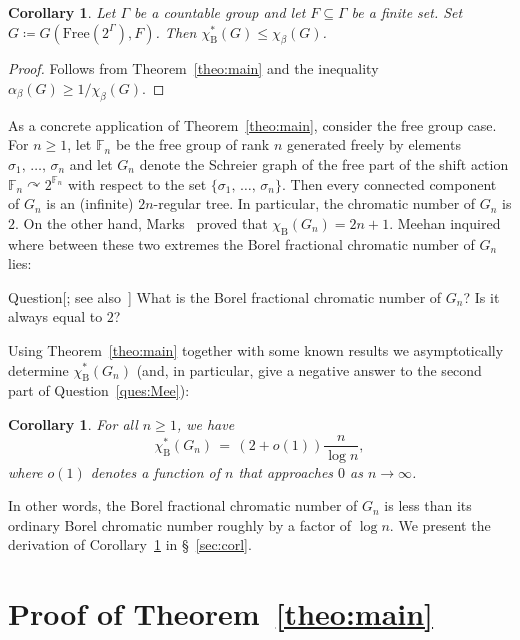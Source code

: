 \documentclass[10pt]{amsart}
\newtheorem{coro}[cdrthm]{Corollary}
\theoremstyle{definition}
\newcommand{\0}{\varnothing}
\newcommand{\set}[1]{\{#1\}}
\renewcommand{\leq}{\leqslant}
\renewcommand{\geq}{\geqslant}
\newcommand{\defeq}{\coloneqq}
\newcommand{\F}{\mathbb{F}}
\newcommand{\Free}{\mathrm{Free}}
\newcommand{\rmB}{\mathrm{B}}
\begin{document}
\begin{coro}
Let $\Gamma$ be a countable group and let $F \subseteq \Gamma$ be a finite set. Set $G
\defeq G(\Free(2^{\Gamma}), F)$. Then $\chi^\ast_\rmB(G) \leq \chi_\beta(G)$.
\end{coro}


\begin{proof}
Follows from Theorem~\ref{theo:main} and the inequality $\alpha_\beta(G) \geq 1/\chi_\beta(G)$.
\end{proof}

As a concrete application of Theorem~\ref{theo:main}, consider the free group case. For $n \geq 1$, let $\F_n$ be the free group of rank $n$ generated freely by elements $\sigma_1,\, \ldots,\,\sigma_n$ and let $G_n$ denote the Schreier graph of the free part of the shift action $\F_n \curvearrowright 2^{\F_n}$ with respect to the set $\set{\sigma_1,\,\ldots,\, \sigma_n}$. Then every connected component of $G_n$ is an (infinite) $2n$-regular tree. In particular, the chromatic number of $G_n$ is $2$. On the other hand, Marks~\cite{Marks} proved that $\chi_{\rmB}(G_n) = 2n+1$. Meehan inquired where between these two extremes the Borel fractional chromatic number of $G_n$ lies:

\begin{enonce}[plain]{Question}[{\cite[Question~4.6.3]{Mee}; see also~\cite[Problem~8.17]{KechrisMarks}}]\label{ques:Mee}
What is the Borel fractional chromatic number of $G_n$? Is it always equal to $2$?
\end{enonce}

Using Theorem~\ref{theo:main} together with some known results we asymptotically determine $\chi_\rmB^\ast(G_n)$ (and, in particular, give a negative answer to the second part of Question~\ref{ques:Mee}):

\begin{coro}\label{corl:free}
For all $n \geq 1$, we have
\[
\chi_\rmB^\ast(G_n) \,=\, (2+o(1))\frac{n}{\log n},
\]
where $o(1)$ denotes a function of $n$ that approaches $0$ as $n \to \infty$.
\end{coro}

In other words, the Borel fractional chromatic number of $G_n$ is less than its ordinary Borel chromatic number roughly by a factor of $\log n$. We present the derivation of Corollary~\ref{corl:free} in \S~\ref{sec:corl}.

\section{Proof of Theorem~\ref{theo:main}}\label{sec:proof}
\end{document}
